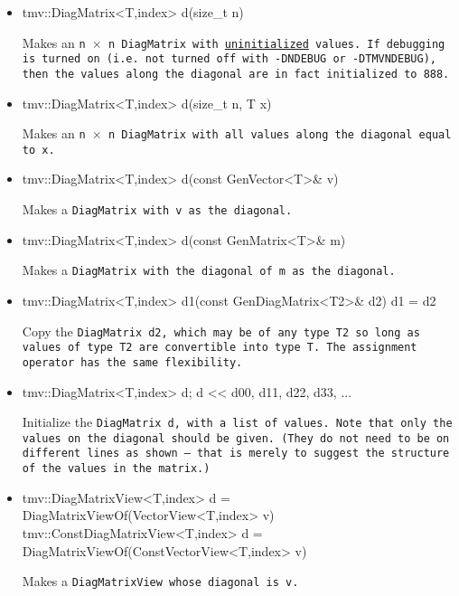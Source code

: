\begin{itemize}
\item 
\begin{tmvcode}
tmv::DiagMatrix<T,index> d(size_t n)
\end{tmvcode}
Makes an \tt{n} $\times$ \tt{n} \tt{DiagMatrix} with \underline{uninitialized} values.
If debugging is turned on (i.e. not turned off
with \tt{-DNDEBUG} or \tt{-DTMVNDEBUG}), then the values along the diagonal are in fact initialized to 888. 

\item
\begin{tmvcode}
tmv::DiagMatrix<T,index> d(size_t n, T x)
\end{tmvcode}
Makes an \tt{n} $\times$ \tt{n} \tt{DiagMatrix} with all values along the diagonal equal to \tt{x}.

\item
\begin{tmvcode}
tmv::DiagMatrix<T,index> d(const GenVector<T>& v)
\end{tmvcode}
Makes a \tt{DiagMatrix} with \tt{v} as the diagonal.

\item 
\begin{tmvcode}
tmv::DiagMatrix<T,index> d(const GenMatrix<T>& m)
\end{tmvcode}
Makes a \tt{DiagMatrix} with the diagonal of \tt{m} as the diagonal.

\item
\begin{tmvcode}
tmv::DiagMatrix<T,index> d1(const GenDiagMatrix<T2>& d2)
d1 = d2
\end{tmvcode}
Copy the \tt{DiagMatrix d2}, which may be of any type \tt{T2} so long
as values of type \tt{T2} are convertible into type \tt{T}.
The assignment operator has the same flexibility.

\item
\begin{tmvcode}
tmv::DiagMatrix<T,index> d;
d << d00,
         d11,
             d22,
                 d33, 
                     ...
\end{tmvcode}
Initialize the \tt{DiagMatrix d}, with a list of values.  Note that only the values on the diagonal should be given.  (They do not need to be on different lines as shown -- that is merely to suggest the structure of the values in the matrix.)

\item
\begin{tmvcode}
tmv::DiagMatrixView<T,index> d = 
      DiagMatrixViewOf(VectorView<T,index> v)
tmv::ConstDiagMatrixView<T,index> d = 
      DiagMatrixViewOf(ConstVectorView<T,index> v)
\end{tmvcode}
Makes a \tt{DiagMatrixView} whose diagonal is \tt{v}.


\end{itemize}
